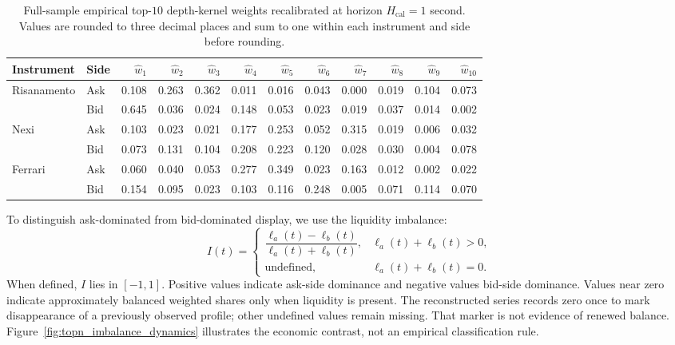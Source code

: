 \begin{table}[htbp]
\centering
\caption{Full-sample empirical top-$10$ depth-kernel weights recalibrated at horizon $H_{\mathrm{cal}}=1$ second. Values are rounded to
three decimal places and sum to one within each instrument and side before rounding.}
\label{tab:empirical_depth_kernel_calibration}
\small
\setlength{\tabcolsep}{3pt}
\begin{tabular}{ll*{10}{r}}
\toprule
Instrument & Side & $\widehat w_1$ & $\widehat w_2$ & $\widehat w_3$ & $\widehat w_4$ & $\widehat w_5$ & $\widehat w_6$ & $\widehat w_7$ & $\widehat w_8$ & $\widehat w_9$ & $\widehat w_{10}$ \\
\midrule
Risanamento & Ask & 0.108 & 0.263 & 0.362 & 0.011 & 0.016 & 0.043 & 0.000 & 0.019 & 0.104 & 0.073 \\
 & Bid & 0.645 & 0.036 & 0.024 & 0.148 & 0.053 & 0.023 & 0.019 & 0.037 & 0.014 & 0.002 \\
Nexi & Ask & 0.103 & 0.023 & 0.021 & 0.177 & 0.253 & 0.052 & 0.315 & 0.019 & 0.006 & 0.032 \\
 & Bid & 0.073 & 0.131 & 0.104 & 0.208 & 0.223 & 0.120 & 0.028 & 0.030 & 0.004 & 0.078 \\
Ferrari & Ask & 0.060 & 0.040 & 0.053 & 0.277 & 0.349 & 0.023 & 0.163 & 0.012 & 0.002 & 0.022 \\
 & Bid & 0.154 & 0.095 & 0.023 & 0.103 & 0.116 & 0.248 & 0.005 & 0.071 & 0.114 & 0.070 \\
\bottomrule
\end{tabular}
\end{table}


\FloatBarrier

To distinguish ask-dominated from bid-dominated display, we use the liquidity imbalance:
\begin{equation}
    I(t)=\begin{cases}
        \dfrac{\ell_a(t)-\ell_b(t)}{\ell_a(t)+\ell_b(t)},
            &\ell_a(t)+\ell_b(t)>0,\\[4pt]
        \text{undefined},&\ell_a(t)+\ell_b(t)=0.
    \end{cases}
    \label{eq:multilevel_dwi}
\end{equation}
When defined, $I$ lies in $[-1,1]$. Positive values indicate ask-side dominance and negative values bid-side dominance. Values near zero indicate approximately balanced weighted shares only when liquidity is present. The reconstructed series records zero once to mark disappearance of a previously observed profile; other undefined values remain missing. That marker is not evidence of renewed balance. Figure~\ref{fig:topn_imbalance_dynamics} illustrates the economic contrast, not an empirical classification rule.

